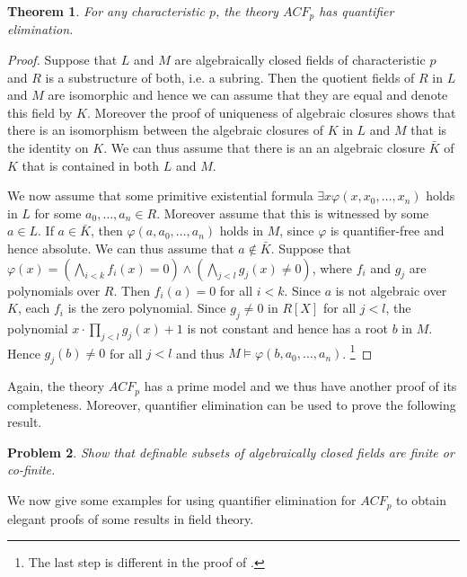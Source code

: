 \documentclass[10pt]{amsart}
\newtheorem{theorem}{Theorem}[subsection]
\newtheorem{problem}[theorem]{Problem}
\theoremstyle{definition}
\theoremstyle{remark}
\begin{document}
\begin{theorem} 
For any characteristic $p$, the theory $ACF_p$ has quantifier elimination.  
\end{theorem} 
\begin{proof} 
Suppose that $L$ and $M$ are algebraically closed fields of characteristic $p$ and $R$ is a substructure of both, i.e. a subring. Then the quotient fields of $R$ in $L$ and $M$ are isomorphic and hence we can assume that they are equal and denote this field by $K$. Moreover the proof of uniqueness of algebraic closures shows that there is an isomorphism between the algebraic closures of $K$ in $L$ and $M$ that is the identity on $K$. We can thus assume that there is an an algebraic closure $\bar{K}$ of $K$ that is contained in both $L$ and $M$. 

We now assume that some primitive existential formula $\exists x \varphi(x,x_0,\dots,x_n)$ holds in $L$ for some $a_0,\dots,a_n\in R$.
Moreover assume that this is witnessed by some $a\in L$. If $a\in \bar{K}$, then $\varphi(a,a_0,\dots,a_n)$ holds in $M$, since $\varphi$ is quantifier-free and hence absolute. We can thus assume that $a\notin \bar{K}$. 
Suppose that $\varphi(x)=(\bigwedge_{i<k}f_i(x)=0)\wedge(\bigwedge_{j<l}g_j(x)\neq 0)$, where $f_i$ and $g_j$ are polynomials over $R$. Then $f_i(a)=0$ for all $i<k$. Since $a$ is not algebraic over $K$, each $f_i$ is the zero polynomial. 
Since $g_j\neq 0$ in $R[X]$ for all $j<l$, the polynomial $x\cdot \prod_{j<l} g_j(x)+1$ is not constant and hence has a root $b$ in $M$. Hence $g_j(b)\neq 0$ for all $j<l$ and thus $M\models \varphi(b,a_0,\dots,a_n)$. \footnote{The last step is different in the proof of \cite[Theorem 3.3.11]{MR2908005}. } 
\end{proof} 

Again, the theory $ACF_p$ has a prime model and we thus have another proof of its completeness. Moreover, quantifier elimination can be used to prove the following result. 

\begin{problem} 
Show that definable subsets of algebraically closed fields are finite or co-finite. 
\end{problem} 


We now give some examples for using quantifier elimination for $ACF_p$ to obtain elegant proofs of some results in field theory. 
\end{document}
